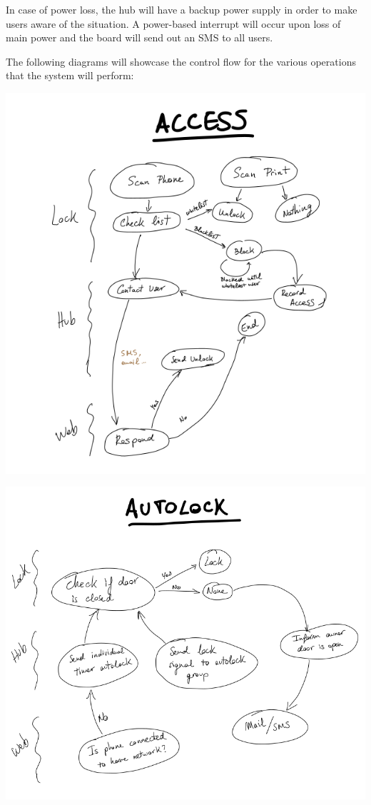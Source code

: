 \documentclass{article}
\begin{document}
In case of power loss, the hub will have a backup power supply in order to
make users aware of the situation. A power-based interrupt will occur upon loss
of main power and the board will send out an SMS to all users.

The following diagrams will showcase the control flow for the various operations
that the system will perform:

\includegraphics[scale=0.4]{access_graph.png}

\includegraphics[scale=0.4]{autolock_graph.png}
\end{document}
